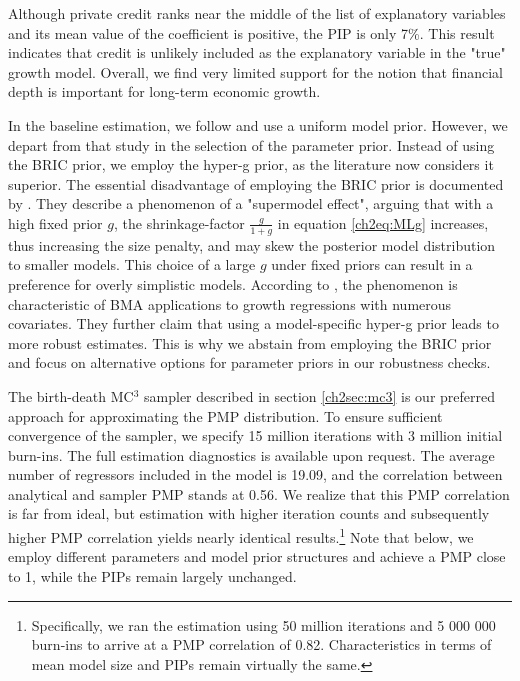\begin{refsection}
Although private credit ranks near the middle of the list of explanatory variables and its mean value of the coefficient is positive, the \ac{PIP} is only 7\%. This result indicates that credit is unlikely included as the explanatory variable in the "true" growth model. Overall, we find very limited support for the notion that financial depth is important for long-term economic growth.

In the baseline estimation, we follow \textcite{Fernandezetal2001} and use a uniform model prior. However, we depart from that study in the selection of the parameter prior. Instead of using the \ac{BRIC} prior, we employ the hyper-g prior, as the literature now considers it superior. The essential disadvantage of employing the \ac{BRIC} prior is documented by \textcite{FeldkircherZeugner2012}. They describe a phenomenon of a "supermodel effect", arguing that with a high fixed prior $g$, the shrinkage-factor $\frac{g}{1+g}$ in equation \ref{ch2eq:MLg} increases, thus increasing the size penalty, and may skew the posterior model distribution to smaller models. This choice of a large $g$ under fixed priors can result in a preference for overly simplistic models. According to \textcite{FeldkircherZeugner2012}, the phenomenon is characteristic of \ac{BMA} applications to growth regressions with numerous covariates. They further claim that using a model-specific hyper-g prior leads to more robust estimates. This is why we abstain from employing the \ac{BRIC} prior and focus on alternative options for parameter priors in our robustness checks.

The birth-death MC$^{3}$ sampler described in section \ref{ch2sec:mc3} is our preferred approach for approximating the \ac{PMP} distribution. To ensure sufficient convergence of the sampler, we specify 15 million iterations with 3 million  initial burn-ins. The full estimation diagnostics is available upon request. The average number of regressors included in the model is 19.09, and the correlation between analytical and sampler \ac{PMP} stands at 0.56. We realize that this \ac{PMP} correlation is far from ideal, but estimation with higher iteration counts and subsequently higher \ac{PMP} correlation yields nearly identical results.\footnote{Specifically, we ran the estimation using 50 million iterations and 5 000 000 burn-ins to arrive at a \ac{PMP} correlation of 0.82. Characteristics in terms of mean model size and \acp{PIP} remain virtually the same.} Note that below, we employ different parameters and model prior structures and achieve a \ac{PMP} close to 1, while the \acp{PIP} remain largely unchanged. 


\end{refsection}
